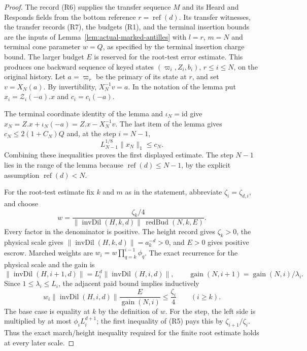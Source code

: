 \begin{proof}
The record (R6) supplies the transfer sequence $M$ and its Heard and Responds fields
from the bottom reference $r=\operatorname{ref}(d)$. Its transfer witnesses,
the transfer records (R7), the budgets (R1), and the terminal insertion bounds are the
inputs of Lemma~\ref{lem:actual-marked-antilles} with $l=r$, $m=N$ and
terminal cone parameter $w=Q$, as specified by the terminal insertion charge bound.
The larger budget $E$ is reserved for the root-test error estimate. This
produces one backward sequence of keyed states $(\varpi_i,Z_i,b_i)$,
$r\leq i\leq N$, on the original history. Let $a=\varpi_r$ be the primary of
its state at $r$, and set $v=X_N(a)$. By invertibility, $X_N^{-1}v=a$.
In the notation of the lemma put $x_i=\mathcal Z_i(-a).x$ and
$c_i=c_i(-a)$.

The terminal coordinate identity of the lemma and $\iota_N=\mathrm{id}$ give
$x_N=Z.x+\iota_N(-a)=Z.x-X_N^{-1}v$. The last item of the lemma gives
$c_N\leq2(1+C_N)Q$ and, at the step $i=N-1$,
\[
 L_{N-1}^{1/8}\|x_N\|_1\leq c_N.
\]
Combining these inequalities proves the first displayed estimate. The
step $N-1$ lies in the range of the lemma because
$\operatorname{ref}(d)\leq N-1$, by the explicit assumption
$\operatorname{ref}(d)<N$.

For the root-test estimate fix $k$ and $m$ as in the statement, abbreviate
$\zeta_i=\zeta_{d,i}$, and choose
\[
 w=\frac{\zeta_k/4}
          {\|\operatorname{invDil}(H,k,d)\|\,\operatorname{redBud}(N,k,E)}.
\]
Every factor in the denominator is positive. The height record gives
$\zeta_k>0$, the physical scale gives
$\|\operatorname{invDil}(H,k,d)\|=a_k^{-d}>0$, and $E>0$ gives positive
escrow. Marched weights are $w_i=w\prod_{q=k}^{i-1}\phi_q$. The exact
recurrence for the physical scale and the gain is
\[
 \|\operatorname{invDil}(H,i+1,d)\|
       =L_i^d\|\operatorname{invDil}(H,i,d)\|,
 \qquad
 \operatorname{gain}(N,i+1)
       =\operatorname{gain}(N,i)/\lambda_i.
\]
Since $1\leq\lambda_i\leq L_i$, the adjacent paid bound
implies inductively
\[
 w_i\|\operatorname{invDil}(H,i,d)\|
       \frac{E}{\operatorname{gain}(N,i)}\leq \frac{\zeta_i}{4}
       \qquad (i\geq k).
\]
The base case is equality at $k$ by the definition of $w$. For the step,
the left side is multiplied by at most $\phi_iL_i^{d+1}$; the first
inequality of (R5) pays this by $\zeta_{i+1}/\zeta_i$. Thus the exact
march/height inequality required for the finite root estimate holds at
every later scale.


\end{proof}
